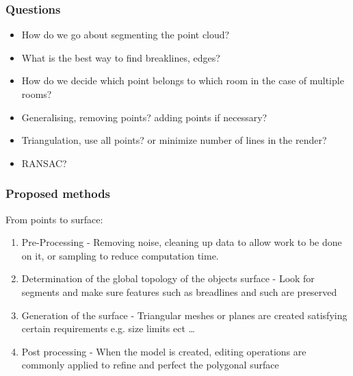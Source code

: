 \subsubsection{Questions}
\begin{itemize}
	
	\item How do we go about segmenting the point cloud?
	
	\item What is the best way to find breaklines, edges?
	
	\item How do we decide which point belongs to which room in the case of multiple rooms?
	
	\item Generalising, removing points? adding points if necessary?
	
	\item Triangulation, use all points? or minimize number of lines in the render?
	
	\item RANSAC?
	
\end{itemize}


\subsubsection{Proposed methods}


From points to surface:

\begin{enumerate}
	\item Pre-Processing - Removing noise, cleaning up data to allow work to be done on it, or sampling to reduce computation time.
	
	\item Determination of the global topology of the objects surface - Look for segments and make sure features such as breadlines and such are preserved
	
	\item Generation of the surface - Triangular meshes or planes are created satisfying certain requirements e.g. size limits ect \ldots
	
	\item Post processing - When the model is created, editing operations are commonly applied to refine and perfect the polygonal surface
\end{enumerate}

